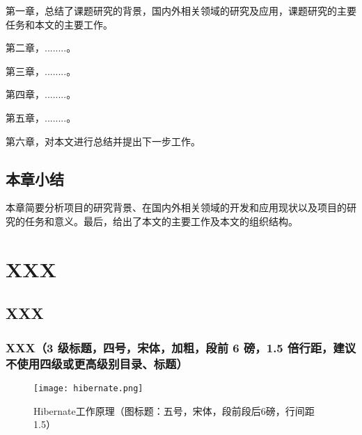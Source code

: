 \documentclass[12pt]{zjutbook}
\begin{document}
第一章，总结了课题研究的背景，国内外相关领域的研究及应用，课题研究的主要任务和本文的主要工作。

第二章，........。

第三章，........。

第四章，........。

第五章，........。

第六章，对本文进行总结并提出下一步工作。

\section{本章小结}
本章简要分析项目的研究背景、在国内外相关领域的开发和应用现状以及项目的研究的任务和意义。最后，给出了本文的主要工作及本文的组织结构。

\chapter{XXX}
\section{XXX}
\subsection{XXX（3 级标题，四号，宋体，加粗，段前 6 磅，1.5 倍行距，建议不使用四级或更高级别目录、标题）}

\begin{figure}[hbp]
  \centering
  \texttt{[image: hibernate.png]}
  \caption{Hibernate工作原理（图标题：五号，宋体，段前段后6磅，行间距1.5）}\label{fig:hibernate}
  \vspace{\baselineskip}
\end{figure}
\clearpage
\end{document}
